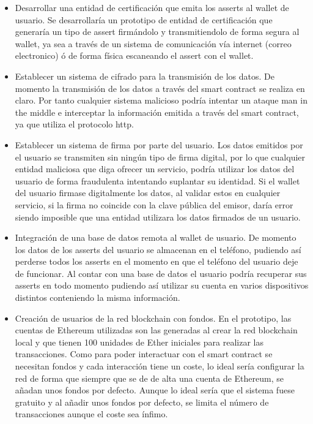 \documentclass[12pt]{report}
\begin{document}
\begin{itemize}

\item Desarrollar una entidad de certificación que emita los asserts al wallet de usuario. Se desarrollaría un prototipo de entidad de certificación que generaría un tipo de assert firmándolo y transmitiendolo de forma segura al wallet, ya sea a través de un sistema de comunicación vía internet (correo electronico) ó de forma física escaneando el assert con el wallet.

\item Establecer un sistema de cifrado para la transmisión de los datos. De momento la transmisión de los datos a través del smart contract se realiza en claro. Por tanto cualquier sistema malicioso podría intentar un ataque man in the middle e interceptar la información emitida a través del smart contract, ya que utiliza el protocolo http.

\item Establecer un sistema de firma por parte del usuario. Los datos emitidos por el usuario se transmiten sin ningún tipo de firma digital, por lo que cualquier entidad maliciosa que diga ofrecer un servicio, podría utilizar los datos del usuario de forma fraudulenta intentando suplantar su identidad. Si el wallet del usuario firmase digitalmente los datos, al validar estos en cualquier servicio, si la firma no coincide con la clave pública del emisor, daría error siendo imposible que una entidad utilizara los datos firmados de un usuario.

\item Integración de una base de datos remota al wallet de usuario. De momento los datos de los asserts del usuario se almacenan en el teléfono, pudiendo así perderse todos los asserts en el momento en que el teléfono del usuario deje de funcionar. Al contar con una base de datos el usuario podría recuperar sus asserts en todo momento pudiendo así utilizar su cuenta en varios dispositivos distintos conteniendo la misma información.

\item Creación de usuarios de la red blockchain con fondos. En el prototipo, las cuentas de Ethereum utilizadas son las generadas al crear la red blockchain local y que tienen 100 unidades de Ether iniciales para realizar las transacciones. Como para poder interactuar con el smart contract se necesitan fondos y cada interacción tiene un coste, lo ideal sería configurar la red de forma que siempre que se de de alta una cuenta de Ethereum, se añadan unos fondos por defecto. Aunque lo ideal sería que el sistema fuese gratuito y al añadir unos fondos por defecto, se limita el número de transacciones aunque el coste sea ínfimo.


\end{itemize}
\end{document}
